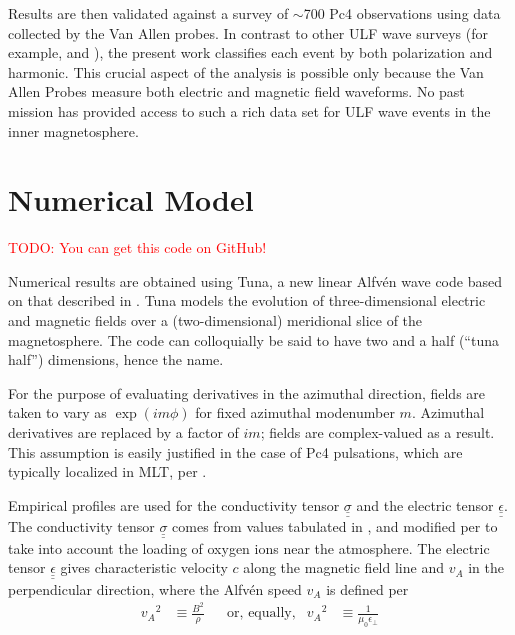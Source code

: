 \documentclass{article}
\newcommand{\about}{\ensuremath{\sim}}
\newcommand{\todo}[1]{ \textcolor{red}{TODO: #1} }
\newcommand{\Alfven}{Alfv\'en\xspace}
\newcommand{\tensor}[1]{\ensuremath{\underline{\underline{#1}}}}
\newcommand{\lr}[1]{ \left( #1 \right) }
\renewcommand{\arg}[1]{\!\lr{#1}}
\newcommand{\azm}{\ensuremath{m}\xspace}
\newcommand{\va}{\ensuremath{v_A}\xspace}
\newcommand{\ep}{\ensuremath{\epsilon_\bot}\xspace}
\newcommand{\mz}{\ensuremath{\mu_0}\xspace}
\begin{document}
Results are then validated against a survey of \about700 Pc4
observations using data collected by the Van Allen probes. In contrast
to other ULF wave surveys (for example, \cite{dai_2015} and
\cite{motoba_2015}), the present work classifies each event by both
polarization and harmonic. This crucial aspect of the analysis is
possible only because the Van Allen Probes measure both electric and
magnetic field waveforms. No past mission has provided access to such a
rich data set for ULF wave events in the inner magnetosphere. 


\section{Numerical Model}

\todo{You can get this code on GitHub!}

Numerical results are obtained using Tuna, a new linear \Alfven wave
code based on that described in \cite{lysak_2013}. Tuna models the
evolution of three-dimensional electric and magnetic fields over a
(two-dimensional) meridional slice of the magnetosphere. The code can
colloquially be said to have two and a half (``tuna half'') dimensions,
hence the name. 

For the purpose of evaluating derivatives in the azimuthal direction,
fields are taken to vary as $\exp \arg{i \azm \phi}$ for fixed azimuthal
modenumber \azm. Azimuthal derivatives are replaced by a factor of
$i \azm$; fields are complex-valued as a result. This assumption is
easily justified in the case of Pc4 pulsations, which are typically
localized in MLT, per
\cite{anderson_1990,dai_2015,engebretson_1992,liu_2009}. 


Empirical profiles are used for the conductivity tensor
$\tensor{\sigma}$ and the electric tensor $\tensor{\epsilon}$. The
conductivity tensor $\tensor{\sigma}$ comes from values tabulated in
\cite{kelley_1989}, and modified per \cite{lysak_2013} to take into
account the loading of oxygen ions near the atmosphere. The electric
tensor $\tensor{\epsilon}$ gives characteristic velocity $c$ along the
magnetic field line and $\va$ in the perpendicular direction, where the
\Alfven speed $\va$ is defined per
\begin{align}
    \label{def_va}
    \va^2 &\equiv \frac{B^2}{\rho} &
    & \text{or, equally,} &
    \va^2 &\equiv \frac{1}{\mz\ep} 
\end{align}
\end{document}
